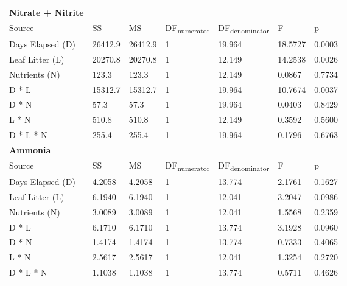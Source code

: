 \begin{table}
\begin{tabular}{ l l l l l l l }
\textbf{Nitrate + Nitrite} & & & & & &\\
Source           & SS       & MS       & DF\textsubscript{numerator} & DF\textsubscript{denominator} & F       & p  \\
Days Elapsed (D) & 26412.9  & 26412.9  & 1                           & 19.964                        & 18.5727 & 0.0003 \\
Leaf Litter (L)  & 20270.8  & 20270.8  & 1                           & 12.149                        & 14.2538 & 0.0026 \\
Nutrients (N)    & 123.3    & 123.3    & 1                           & 12.149                        & 0.0867  & 0.7734 \\
D * L            & 15312.7  & 15312.7  & 1                           & 19.964                        & 10.7674 & 0.0037 \\
D * N            & 57.3     & 57.3     & 1                           & 19.964                        & 0.0403  & 0.8429 \\
L * N            & 510.8    & 510.8    & 1                           & 12.149                        & 0.3592  & 0.5600 \\
D * L * N        & 255.4    & 255.4    & 1                           & 19.964                        & 0.1796  & 0.6763 \\

\textbf{Ammonia} & & & & & &\\
Source           & SS      & MS     & DF\textsubscript{numerator} & DF\textsubscript{denominator} & F       & p  \\
Days Elapsed (D) & 4.2058  & 4.2058 & 1                           & 13.774                        & 2.1761  & 0.1627 \\
Leaf Litter (L)  & 6.1940  & 6.1940 & 1                           & 12.041                        & 3.2047  & 0.0986 \\
Nutrients (N)    & 3.0089  & 3.0089 & 1                           & 12.041                        & 1.5568  & 0.2359 \\
D * L            & 6.1710  & 6.1710 & 1                           & 13.774                        & 3.1928  & 0.0960 \\
D * N            & 1.4174  & 1.4174 & 1                           & 13.774                        & 0.7333  & 0.4065 \\
L * N            & 2.5617  & 2.5617 & 1                           & 12.041                        & 1.3254  & 0.2720 \\
D * L * N        & 1.1038  & 1.1038 & 1                           & 13.774                        & 0.5711  & 0.4626 \\


\end{tabular}
\end{table}
